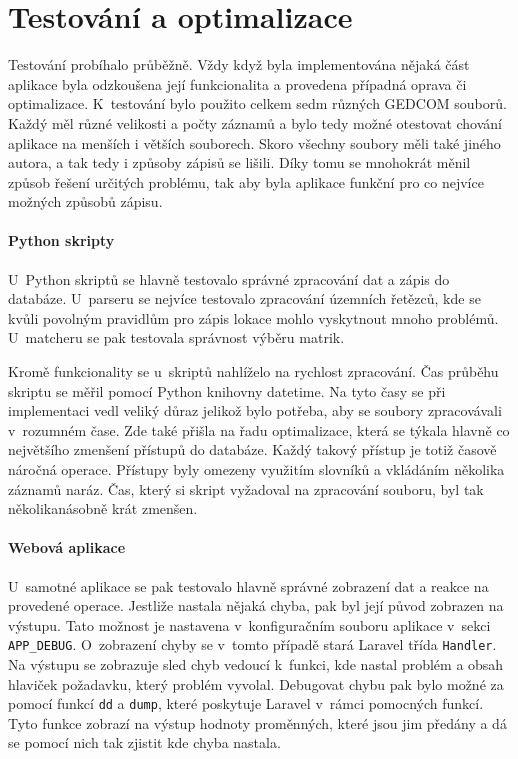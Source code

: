 \chapter{Testování a optimalizace}

Testování probíhalo průběžně. Vždy když byla implementována nějaká část aplikace byla odzkoušena její funkcionalita a provedena případná oprava či optimalizace. K~testování bylo použito celkem sedm různých GEDCOM souborů. Každý měl různé velikosti a počty záznamů a bylo tedy možné otestovat chování aplikace na menších i větších souborech. Skoro všechny soubory měli také jiného autora, a tak tedy i způsoby zápisů se lišili. Díky tomu se mnohokrát měnil způsob řešení určitých problému, tak aby byla aplikace funkční pro co nejvíce možných způsobů zápisu.

\subsubsection{Python skripty}

U~Python skriptů se hlavně testovalo správné zpracování dat a zápis do databáze. U~parseru se nejvíce testovalo zpracování územních řetězců, kde se kvůli povolným pravidlům pro zápis lokace mohlo vyskytnout mnoho problémů. U~matcheru se pak testovala správnost výběru matrik. 

Kromě funkcionality se u~skriptů nahlíželo na rychlost zpracování. Čas průběhu skriptu se měřil pomocí Python knihovny datetime. Na tyto časy se při implementaci vedl veliký důraz jelikož bylo potřeba, aby se soubory zpracovávali v~rozumném čase. Zde také přišla na řadu optimalizace, která se týkala hlavně co největšího zmenšení přístupů do databáze. Každý takový přístup je totiž časově náročná operace. Přístupy byly omezeny využitím slovníků a vkládáním několika záznamů naráz. Čas, který si skript vyžadoval na zpracování souboru, byl tak několikanásobně krát zmenšen.

\subsubsection{Webová aplikace}

U~samotné aplikace se pak testovalo hlavně správné zobrazení dat a reakce na provedené operace. Jestliže nastala nějaká chyba, pak byl její původ zobrazen na výstupu. Tato možnost je nastavena v~konfiguračním souboru aplikace v~sekci \verb|APP_DEBUG|. O~zobrazení chyby se v~tomto případě stará Laravel třída \verb|Handler|. Na výstupu se zobrazuje sled chyb vedoucí k~funkci, kde nastal problém a obsah hlaviček požadavku, který problém vyvolal. Debugovat chybu pak bylo možné za pomocí funkcí \verb|dd| a \verb|dump|, které poskytuje Laravel v~rámci pomocných funkcí. Tyto funkce zobrazí na výstup hodnoty proměnných, které jsou jim předány a dá se pomocí nich tak zjistit kde chyba nastala.